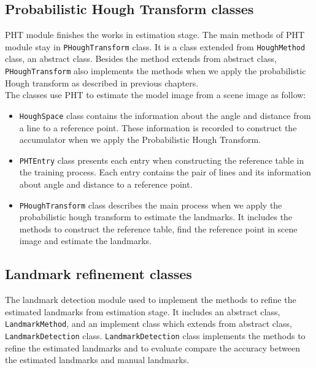 \subsection{Probabilistic Hough Transform classes}
PHT module finishes the works in estimation stage. The main methods of PHT module stay in \texttt{PHoughTransform} class. It is a class extended from \texttt{HoughMethod} class, an abstract class. Besides the method extends from abstract class, \texttt{PHoughTransform} also implements the methods when we apply the probabilistic Hough transform as described in previous chapters.\\
The classes use PHT to estimate the model image from a scene image as follow:
\begin{itemize}
\item \texttt{HoughSpace} class contains the information about the angle and distance from a line to a reference point. These information is recorded to construct the accumulator when we apply the Probabilistic Hough Transform.
\item \texttt{PHTEntry} class presents each entry when constructing the reference table in the training process. Each entry contains the pair of lines and its information about angle and distance to a reference point.
\item \texttt{PHoughTransform} class describes the main process when we apply the probabilistic hough transform to estimate the landmarks. It includes the methods to construct the reference table, find the reference point in scene image and estimate the landmarks.
\end{itemize}
\subsection{Landmark refinement classes}
The landmark detection module used to implement the methods to refine the estimated landmarks from estimation stage. It includes an abstract class, \texttt{LandmarkMethod}, and an implement class which extends from abstract class, \texttt{LandmarkDetection} class. \texttt{LandmarkDetection} class implements the methods to refine the estimated landmarks and to evaluate compare the accuracy between the estimated landmarks and manual landmarks.
